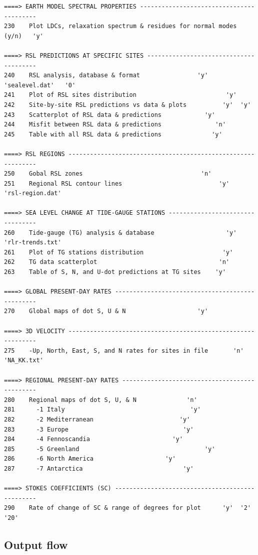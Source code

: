 \documentclass[11pt,fleqn,a4paper,titlepage]{article}
\begin{document}
{{\begin{verbatim}
====> EARTH MODEL SPECTRAL PROPERTIES -----------------------------------------
230    Plot LDCs, relaxation spectrum & residues for normal modes  (y/n)   'y'      

====> RSL PREDICTIONS AT SPECIFIC SITES ---------------------------------------
240    RSL analysis, database & format                'y'  'sealevel.dat'   '0'
241    Plot of RSL sites distribution                         'y' 
242    Site-by-site RSL predictions vs data & plots          'y'  'y'
243    Scatterplot of RSL data & predictions       	    'y' 
244    Misfit between RSL data & predictions               'n'
245    Table with all RSL data & predictions              'y'

====> RSL REGIONS -------------------------------------------------------------
250    Gobal RSL zones  	                           'n'
251    Regional RSL contour lines                           'y'   'rsl-region.dat'

====> SEA LEVEL CHANGE AT TIDE-GAUGE STATIONS --------------------------------- 
260    Tide-gauge (TG) analysis & database                    'y' 'rlr-trends.txt'      
261    Plot of TG stations distribution                      'y'
262    TG data scatterplot   	                            'n' 
263    Table of S, N, and U-dot predictions at TG sites    'y'  

====> GLOBAL PRESENT-DAY RATES ------------------------------------------------
270    Global maps of dot S, U & N               	  'y' 

====> 3D VELOCITY -------------------------------------------------------------
275    -Up, North, East, S, and N rates for sites in file       'n' 'NA_KK.txt'

====> REGIONAL PRESENT-DAY RATES ---------------------------------------------- 
280    Regional maps of dot S, U, & N 	           'n'	     
281      -1 Italy                                   'y'
282      -2 Mediterranean     		             'y'
283      -3 Europe     		                      'y'
284      -4 Fennoscandia   		               'y'
285      -5 Greenland                                   'y'
286      -6 North America  			         'y'
287      -7 Antarctica   		                  'y'

====> STOKES COEFFICIENTS (SC) ------------------------------------------------
290    Rate of change of SC & range of degrees for plot      'y'  '2'  '20'
\end{verbatim} }}


\subsection{Output flow}\label{sec:flow}
\end{document}
